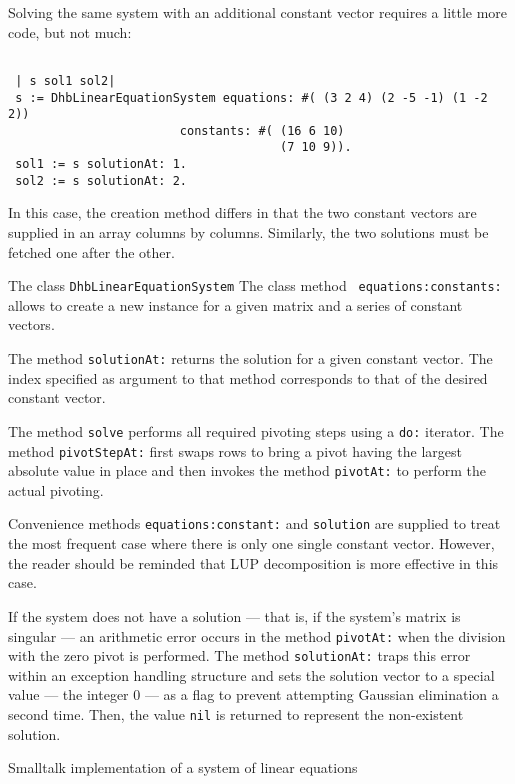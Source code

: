 \documentclass[twoside]{book}
\begin{document}
Solving the same system with an additional constant vector
requires a little more code, but not much:
\begin{codeExample}
\begin{verbatim}

 | s sol1 sol2|
 s := DhbLinearEquationSystem equations: #( (3 2 4) (2 -5 -1) (1 -2 2))
                        constants: #( (16 6 10)
                                      (7 10 9)).
 sol1 := s solutionAt: 1.
 sol2 := s solutionAt: 2.
\end{verbatim}
\end{codeExample}
In this case, the creation method differs in that the two constant
vectors are supplied in an array columns by columns. Similarly,
the two solutions must be fetched one after the other.

The class {\tt DhbLinearEquationSystem} The class method {\tt
equations:constants:} allows to create a new instance for a given
matrix and a series of constant vectors.

The method {\tt solutionAt:} returns the solution for a given
constant vector. The index specified as argument to that method
corresponds to that of the desired constant vector.


The method {\tt solve} performs all required pivoting steps using
a {\tt do:} iterator. The method {\tt pivotStepAt:} first swaps
rows to bring a pivot having the largest absolute value in place
and then invokes the method {\tt pivotAt:} to perform the actual
pivoting.

Convenience methods {\tt equations:constant:} and {\tt solution}
are supplied to treat the most frequent case where there is only
one single constant vector. However, the reader should be reminded
that LUP decomposition is more effective in this case.

If the system does not have a solution --- that is, if the
system's matrix is singular --- an arithmetic error occurs in the
method {\tt pivotAt:} when the division with the zero pivot is
performed. The method {\tt solutionAt:} traps this error within an
exception handling structure and sets the solution vector to a
special value --- the integer 0 --- as a flag to prevent
attempting Gaussian elimination a second time. Then, the value
{\tt nil} is returned to represent the non-existent solution.

\begin{listing} Smalltalk implementation of a system of linear equations
\label{ls:lineqs}

\end{listing}
\end{document}
